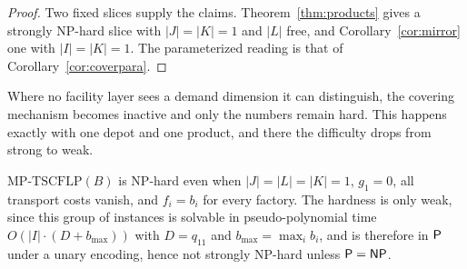 \begin{proof}
Two fixed slices supply the claims.
Theorem~\ref{thm:products} gives a strongly NP-hard slice with
$|J|=|K|=1$ and $|L|$ free, and Corollary~\ref{cor:mirror} one with
$|I|=|K|=1$. The parameterized reading is that of
Corollary~\ref{cor:coverpara}.
\end{proof}

Where no facility layer sees a demand dimension it can distinguish, the
covering mechanism becomes inactive and only the numbers remain hard. This
happens exactly with one depot and one product, and there the difficulty
drops from strong to weak.

\begin{theorem}\label{thm:partition}
$\mathrm{MP\text{-}TSCFLP}(B)$ is NP-hard even when $|J|=|L|=|K|=1$,
$g_1=0$, all transport costs vanish, and $f_i=b_i$ for every factory.
The hardness is only weak, since this group of instances is solvable in
pseudo-polynomial time $O(|I|\cdot(D+b_{\max}))$ with $D=q_{11}$ and
$b_{\max}=\max_i b_i$, and is therefore in $\textsf{P}$ under a unary
encoding, hence not strongly NP-hard unless $\textsf{P}=\textsf{NP}$.
\end{theorem}

